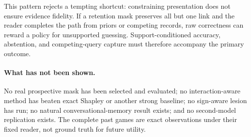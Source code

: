 This pattern rejects a tempting shortcut: constraining presentation does not ensure
evidence fidelity. If a retention mask preserves all but one link and the reader
completes the path from priors or competing records, raw correctness can reward a
policy for unsupported guessing. Support-conditioned accuracy, abstention, and
competing-query capture must therefore accompany the primary outcome.

\paragraph{What has not been shown.}
No real prospective mask has been selected and evaluated; no interaction-aware
method has beaten exact Shapley or another strong baseline; no sign-aware lesion has
run; no natural conversational-memory result exists; and no second-model replication
exists. The complete past games are exact observations under their fixed reader,
not ground truth for future utility.
